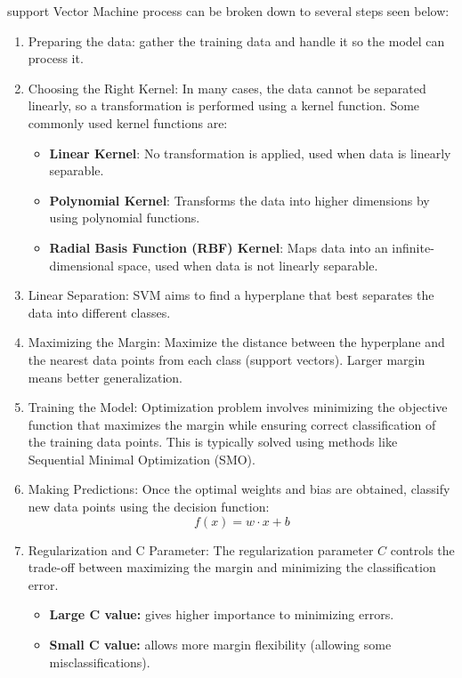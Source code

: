 support Vector Machine process can be broken down to several steps seen below:

\begin{enumerate}[label=\textbf{Step \arabic*.}]
    \item Preparing the data: gather the training data and handle it so the model can process it.

    \renewcommand{\labelitemi}{\bullet}
    \item Choosing the Right Kernel: In many cases, the data cannot be separated linearly, so a transformation is performed using a kernel function. Some commonly used kernel functions are:
    \begin{itemize}
        \item \textbf{Linear Kernel}: No transformation is applied, used when data is linearly separable.
        \item \textbf{Polynomial Kernel}: Transforms the data into higher dimensions by using polynomial functions.
        \item \textbf{Radial Basis Function (RBF) Kernel}: Maps data into an infinite-dimensional space, used when data is not linearly separable.
    \end{itemize}

    \renewcommand{\labelitemi}{-}
    \item Linear Separation: SVM aims to find a hyperplane that best separates the data into different classes.

    \item Maximizing the Margin: Maximize the distance between the hyperplane and the nearest data points from each class (support vectors).
    Larger margin means better generalization.

    \item Training the Model: Optimization problem involves minimizing the objective function that maximizes the margin while ensuring correct classification of the training data points.
    This is typically solved using methods like Sequential Minimal Optimization (SMO).

    \item Making Predictions: Once the optimal weights and bias are obtained, classify new data points using the decision function:
    \begin{equation}
        f(x) = w \cdot x + b\label{eq:equation10}
    \end{equation}

    \item Regularization and C Parameter: The regularization parameter \(C\) controls the trade-off between maximizing the margin and minimizing the classification error.
    \begin{itemize}
        \item \textbf{Large C value:} gives higher importance to minimizing errors.
        \item \textbf{Small C value:} allows more margin flexibility (allowing some misclassifications).
    \end{itemize}
\end{enumerate}

